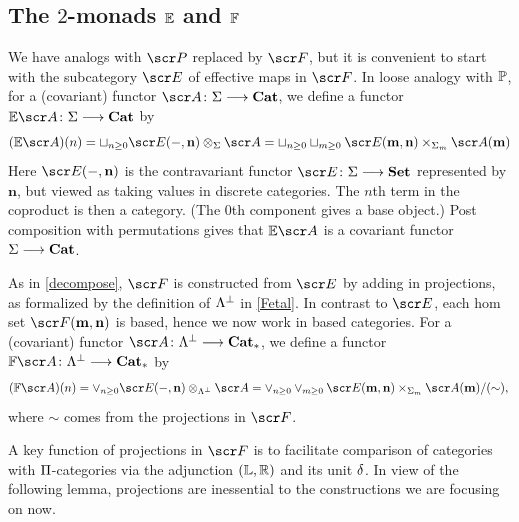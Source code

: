 \documentclass{amsart}
\theoremstyle{definition}
\numberwithin{equation}{section}
\newcommand{\bm}{\mathbf{m}}
\newcommand{\bn}{\mathbf{n}}
\begin{document}
\subsection{The $2$-monads $\mathbb{E}$ and $\mathbb{F}$} 

We have analogs with $\sP$ replaced by $\sF$, but it is convenient to start with the subcategory $\sE$ of  effective maps in $\sF$.   In loose analogy with $\mathbb{P}$, for a (covariant) functor 
$\sA \colon \SI \rtarr \mathbf{Cat}$, we define a  functor $\bE\sA\colon \SI \rtarr \mathbf{Cat}$ by
\begin{equation}\label{Edefn}
(\bE\sA)(n) = \sqcup_{n\geq 0} \sE(-,\bn) \otimes_{\SI} \sA = \sqcup_{n\geq 0}\sqcup_{m\geq 0}\sE(\bm,\bn)\times_{\SI_m} \sA(\bm)\\
\end{equation}
Here $\sE(-,\bn)$ is the contravariant functor $\sE\colon \SI \rtarr  \mathbf{Set}$ represented by $\bn$, but viewed as taking values in discrete categories.  The $n$th term in the coproduct is then a category.  (The $0$th component gives a base object.)  Post composition with permutations gives that $\bE\sA$ is a covariant functor $\Sigma \longrightarrow \mathbf{Cat}$.

As in \autoref{decompose}, $\sF$ is constructed from $\sE$ by adding in projections, as formalized by the definition of $\Lambda^{\perp}$ in \autoref{Fetal}. In contrast to $\sE$, each hom set $\sF(\bm,\bn)$ is based, hence we now work in based categories.  For a (covariant) functor  $\sA \colon \LA^{\perp} \rtarr \mathbf{Cat}_*$, we define a  functor 
$\bF\sA\colon \LA^{\perp} \rtarr \mathbf{Cat}_*$ by
\begin{equation}\label{Fdefn}
(\bF\sA)(n) = \vee_{n\geq 0} \sE(-,\bn) \otimes_{\LA^{\perp}} \sA = \vee_{n\geq 0}\vee_{m\geq 0}\sE(\bm,\bn)\times_{\SI_m} \sA(\bm)/(\sim),\\
\end{equation}
where $\sim$ comes from the projections in $\sF$.  

A key function of projections in $\sF$ is to facilitate comparison of categories with $\Pi$-categories via the adjunction $(\mathbb{L},\mathbb{R})$ and its unit $\delta$.    In view of the following lemma, projections are inessential to the constructions we are focusing on now. 
\end{document}
